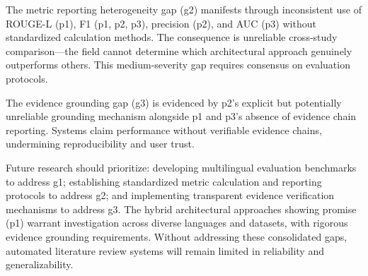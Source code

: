 \documentclass{article}
\begin{document}
The metric reporting heterogeneity gap (g2) manifests through inconsistent use of ROUGE-L (p1), F1 (p1, p2, p3), precision (p2), and AUC (p3) without standardized calculation methods. The consequence is unreliable cross-study comparison—the field cannot determine which architectural approach genuinely outperforms others. This medium-severity gap requires consensus on evaluation protocols.

The evidence grounding gap (g3) is evidenced by p2's explicit but potentially unreliable grounding mechanism alongside p1 and p3's absence of evidence chain reporting. Systems claim performance without verifiable evidence chains, undermining reproducibility and user trust.

Future research should prioritize: developing multilingual evaluation benchmarks to address g1; establishing standardized metric calculation and reporting protocols to address g2; and implementing transparent evidence verification mechanisms to address g3. The hybrid architectural approaches showing promise (p1) warrant investigation across diverse languages and datasets, with rigorous evidence grounding requirements. Without addressing these consolidated gaps, automated literature review systems will remain limited in reliability and generalizability.
\end{document}
